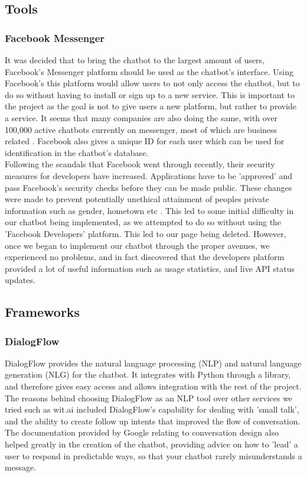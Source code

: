 \documentclass[12pt,a4paper]{article}
\begin{document}
    \subsection{Tools}
    \subsubsection{Facebook Messenger}
    It was decided that to bring the chatbot to the largest amount of users, Facebook's Messenger platform should be used as the chatbot's interface. Using Facebook's this platform would allow users to not only access the chatbot, but to do so without having to install or sign up to a new service. This is important to the project as the goal is not to give users a new platform, but rather to provide a service. It seems that many companies are also doing the same, with over 100,000 active chatbots currently on messenger, most of which are business related \citep{Parr17}. Facebook also gives a unique ID for each user which can be used for identification in the chatbot's database. \\
    
    Following the scandals that Facebook went through recently, their security measures for developers have increased. Applications have to be 'approved' and pass Facebook's security checks before they can be made public. These changes were made to prevent potentially unethical attainment of peoples private information such as gender, hometown etc \citep{Perez18}. This led to some initial difficulty in our chatbot being implemented, as we attempted to do so without using the 'Facebook Developers' platform. This led to our page being deleted. However, once we began to implement our chatbot through the proper avenues, we experienced no problems, and in fact discovered that the developers platform provided a lot of useful information such as usage statistics, and live API status updates.
    
    \subsection{Frameworks}
    
    \subsubsection{DialogFlow}
    DialogFlow provides the natural language processing (NLP) and natural language generation (NLG) for the chatbot. It integrates with Python through a library, and therefore gives easy access and allows integration with the rest of the project. The reasons behind choosing DialogFlow as an NLP tool over other services we tried such as wit.ai included DialogFlow's capability for dealing with 'small talk', and the ability to create follow up intents that improved the flow of conversation. The documentation provided by Google relating to conversation design also helped greatly in the creation of the chatbot, providing advice on how to 'lead' a user to respond in predictable ways, so that your chatbot rarely misunderstands a message. \\
    
\end{document}
